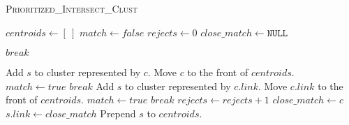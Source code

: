 \begin{algorithm}[H]
  \caption{\textsc{Prioritized\_Intersect\_Clust}}
  \label{alg:intersect_clust}
  \begin{algorithmic}[1]
    \Statex
      \State $centroids \gets [~]$ 
        \State $match \gets false$
        \State $rejects \gets 0$
        \State $close\_match \gets \mathtt{NULL}$

            \State $break$
          \EndIf

          \State{}
              \State Add $s$ to cluster represented by $c$.
              \State Move $c$ to the front of $centroids$.
              \State $match \gets true$
              \State $break$
            \EndIf
            \State
              \State Add $s$ to cluster represented by $c.link$.
              \State Move $c.link$ to the front of $centroids$.
              \State $match \gets true$
              \State $break$
            \EndIf
            \State $rejects \gets rejects + 1$
            \State $close\_match \gets c$
          \EndIf
        \EndFor
        \State
          
            \State $s.link \gets close\_match$
          \EndIf
          \State Prepend $s$ to $centroids$.
        \EndIf
      \EndFor
    \EndFunction
  \end{algorithmic}
\end{algorithm}
